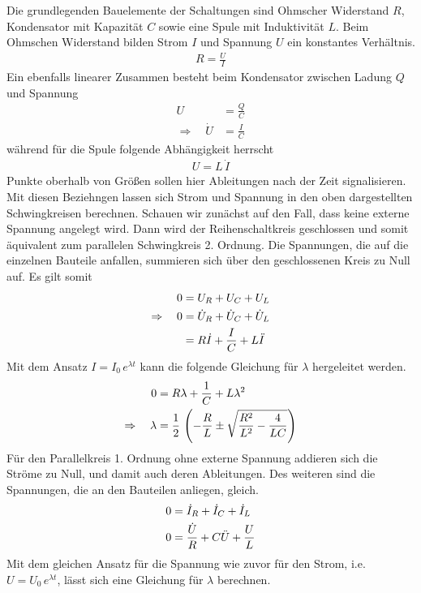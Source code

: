Die grundlegenden Bauelemente der Schaltungen sind Ohmscher Widerstand $R$, Kondensator mit Kapazität $C$ sowie eine Spule mit Induktivität $L$. Beim Ohmschen Widerstand bilden Strom $I$ und Spannung $U$ ein konstantes Verhältnis. 
\begin{align*}
    R=\frac{U}{I}
\end{align*}
Ein ebenfalls linearer Zusammen besteht beim Kondensator zwischen Ladung $Q$ und Spannung
\begin{align*}
    U&=\frac{Q}{C}\\
    \Rightarrow\quad\dot{U}&=\frac{I}{C}
\end{align*}
während für die Spule folgende Abhängigkeit herrscht
\begin{align*}
    U=L\,\dot{I}
\end{align*}
Punkte oberhalb von Größen sollen hier Ableitungen nach der Zeit signalisieren. Mit diesen Beziehngen lassen sich Strom und Spannung in den oben dargestellten Schwingkreisen berechnen. Schauen wir zunächst auf den Fall, dass keine externe Spannung angelegt wird. Dann wird der Reihenschaltkreis geschlossen und somit äquivalent zum parallelen Schwingkreis 2. Ordnung. Die Spannungen, die auf die einzelnen Bauteile anfallen, summieren sich über den geschlossenen Kreis zu Null auf.  Es gilt somit
\begin{align}
    0&=U_R+U_C+U_L\notag\\
    \Rightarrow\quad0&=\dot{U}_R+\dot{U}_C+\dot{U}_L\notag\\
    &=R\dot{I}+\frac{I}{C}+L\ddot{I}\label{eq:hom_Reihe}
\end{align}
Mit dem Ansatz $I=I_0\,e^{\lambda t}$ kann die folgende Gleichung für $\lambda$ hergeleitet werden.
\begin{align*}
    0&=R\lambda+\frac{1}{C}+L\lambda^2\\
    \Rightarrow\quad\lambda&=\frac{1}{2}\,\left( -\frac{R}{L}\pm\sqrt{\frac{R^2}{L^2}-\frac{4}{LC}} \right)
\end{align*}
Für den Parallelkreis 1. Ordnung ohne externe Spannung addieren sich die Ströme zu Null, und damit auch deren Ableitungen. Des weiteren sind die Spannungen, die an den Bauteilen anliegen, gleich.
\begin{align}
    0&=\dot{I}_R+\dot{I}_C+\dot{I}_L\notag\\
    0&=\frac{\dot{U}}{R}+C\ddot{U}+\frac{U}{L}\label{eq:hom_parallel}
\end{align}
Mit dem gleichen Ansatz für die Spannung wie zuvor für den Strom, i.e. $U=U_0\,e^{\lambda t}$, lässt sich eine Gleichung für $\lambda$ berechnen.
